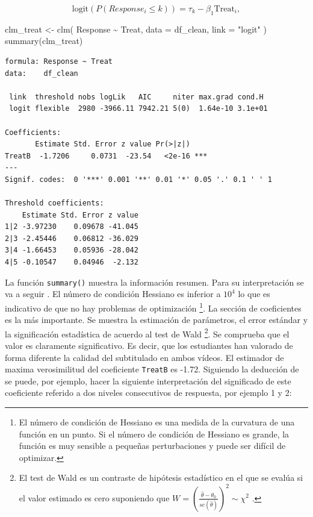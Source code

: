 \documentclass[
  12pt,
  a4paper,
  extrafontsizes,
  onecolumn,
  openright,
  table]{memoir}
\newenvironment{Shaded}{\begin{snugshade}}{\end{snugshade}}
\newcommand{\AttributeTok}[1]{\textcolor[rgb]{0.40,0.45,0.13}{#1}}
\newcommand{\FunctionTok}[1]{\textcolor[rgb]{0.28,0.35,0.67}{#1}}
\newcommand{\NormalTok}[1]{\textcolor[rgb]{0.00,0.23,0.31}{#1}}
\newcommand{\OtherTok}[1]{\textcolor[rgb]{0.00,0.23,0.31}{#1}}
\newcommand{\SpecialCharTok}[1]{\textcolor[rgb]{0.37,0.37,0.37}{#1}}
\newcommand{\StringTok}[1]{\textcolor[rgb]{0.13,0.47,0.30}{#1}}
\begin{document}
\[
\text{logit}(P(Response_i \leq k)) = \tau_k - \beta_1 \text{Treat}_i,
\]

\scriptsize

\begin{Shaded}
\begin{Highlighting}[]
\NormalTok{clm\_treat }\OtherTok{\textless{}{-}}
    \FunctionTok{clm}\NormalTok{(}
\NormalTok{        Response }\SpecialCharTok{\textasciitilde{}}\NormalTok{ Treat,}
        \AttributeTok{data =}\NormalTok{ df\_clean, }\AttributeTok{link =} \StringTok{"logit"}
\NormalTok{    )}
\FunctionTok{summary}\NormalTok{(clm\_treat)}
\end{Highlighting}
\end{Shaded}

\begin{verbatim}
formula: Response ~ Treat
data:    df_clean

 link  threshold nobs logLik   AIC     niter max.grad cond.H 
 logit flexible  2980 -3966.11 7942.21 5(0)  1.64e-10 3.1e+01

Coefficients:
       Estimate Std. Error z value Pr(>|z|)    
TreatB  -1.7206     0.0731  -23.54   <2e-16 ***
---
Signif. codes:  0 '***' 0.001 '**' 0.01 '*' 0.05 '.' 0.1 ' ' 1

Threshold coefficients:
    Estimate Std. Error z value
1|2 -3.97230    0.09678 -41.045
2|3 -2.45446    0.06812 -36.029
3|4 -1.66453    0.05936 -28.042
4|5 -0.10547    0.04946  -2.132
\end{verbatim}

\normalsize

La función \texttt{summary()} muestra la información resumen. Para su
interpretación se va a seguir \textcite{christensen2018CumulativeLM}. El
número de condición Hessiano es inferior a \(10^4\) lo que es indicativo
de que no hay problemas de optimización \footnote{El número de condición
  de Hessiano es una medida de la curvatura de una función en un punto.
  Si el número de condición de Hessiano es grande, la función es muy
  sensible a pequeñas perturbaciones y puede ser difícil de optimizar.}.
La sección de coeficientes es la más importante. Se muestra la
estimación de parámetros, el error estándar y la significación
estadística de acuerdo al test de Wald \footnote{El test de Wald es un
  contraste de hipótesis estadístico en el que se evalúa si el valor
  estimado es cero suponiendo que
  \(W = \left(\frac{\hat{\theta} - \theta_0}{se(\hat{\theta})}\right)^2 \sim \chi^{2}\)
  .}. Se comprueba que el valor es claramente significativo. Es decir,
que los estudiantes han valorado de forma diferente la calidad del
subtitulado en ambos vídeos. El estimador de maxima verosimilitud del
coeficiente \texttt{TreatB} es -1.72. Siguiendo la deducción de
\textcite{bruin2011} se puede, por ejemplo, hacer la siguiente
interpretación del significado de este coeficiente referido a dos
niveles consecutivos de respuesta, por ejemplo 1 y 2:
\end{document}

